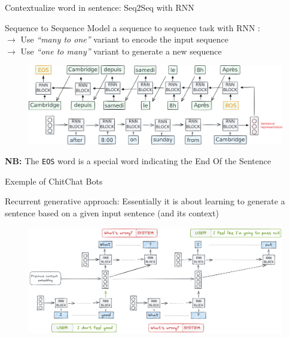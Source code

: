 \documentclass[10pt,aspectratio=169]{beamer}
\begin{document}
  \begin{frame}[noframenumbering]{Contextualize word in sentence: Seq2Seq with RNN}

    \begin{block}{Sequence to Sequence}
      \vspace{.1cm}
      {\footnotesize
        Model a sequence to sequence task with RNN :\\ 
        $\rightarrow $ Use \textit{``many to one''} variant to encode the input sequence\\
        $\rightarrow $ Use \textit{``one to many''} variant to generate a new sequence\\
      } 
    \end{block}

    \begin{figure}
      \centering
      \includegraphics[width=1.\textwidth]{img/RNN-example-seq2seq-0.pdf}
    \end{figure}
    \pause
    {\tiny \textbf{NB:} The \texttt{EOS} word is a special word indicating the End Of the Sentence}
  \end{frame}


\begin{frame}{Exemple of ChitChat Bots}

            \begin{block}{Recurrent generative approach:}
                Essentially it is about learning to generate a sentence based on a given input sentence (and its context) \cite{serban-2016-building}
            \end{block}

    \begin{figure}
        \centering
        \includegraphics[width=.8\textwidth]{media/chitchat.png}
    \end{figure}
\end{frame}
\end{document}
